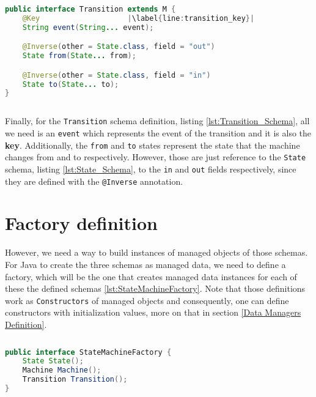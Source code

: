 \begin{sourcecode}[H]
	\begin{lstlisting}[language=Java,escapechar=|]
public interface Transition extends M {
	@Key 					|\label{line:transition_key}| 
	String event(String... event);

	@Inverse(other = State.class, field = "out")
	State from(State... from);

	@Inverse(other = State.class, field = "in")
	State to(State... to);
}
	\end{lstlisting}
	\caption{The Transition Schema}
	\label{lst:Transition_Schema}
\end{sourcecode}

Finally, for the \texttt{Transition} schema definition, listing \ref{lst:Transition_Schema}, all we need is an \texttt{event} which represents the event of the transition and it is also the \textbf{key}.
Additionally, the \texttt{from} and \texttt{to} states represent the state that the machine changes from and to respectively.
However, those are just reference to the \texttt{State} schema, listing \ref{lst:State_Schema}, to the \texttt{in} and \texttt{out} fields respectively, since they are defined with the \texttt{@Inverse} annotation.

\section{Factory definition}
However, we need a way to build instances of managed objects of those schemas. 
For Java to create the three schemas as managed data, we need to define a factory, which will be the one that creates managed data instances for each of these the defined schemas \ref{lst:StateMachineFactory}.
Note that those definitions work as \texttt{Constructors} of managed objects and consequently, one can define constructors with initialization values, more on that in section \ref{Data Managers Definition}.

\begin{sourcecode}[H]
	\begin{lstlisting}[language=Java,escapechar=|]
public interface StateMachineFactory {
	State State();
	Machine Machine();
	Transition Transition();
}
	\end{lstlisting}
	\caption{The StateMachine Factory}
	\label{lst:StateMachineFactory}
\end{sourcecode}


